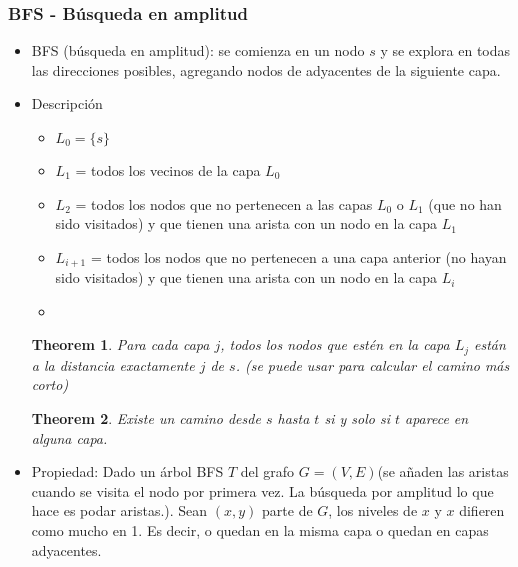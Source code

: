 \documentclass[12pt, fleqn]{article}
\newtheorem{theorem}{Theorem}[section]
\theoremstyle{definition}
\begin{document}
            \subsubsection{BFS - Búsqueda en amplitud}
                \begin{itemize}
                    \item BFS (búsqueda en amplitud): se comienza en un nodo $s$ y se explora en todas las direcciones posibles, 
                        agregando nodos de adyacentes de la siguiente capa.
                    \item Descripción
                        \begin{itemize}
                            \item $L_0 = \{s\}$
                            \item $L_1$ = todos los vecinos de la capa $L_0$
                            \item $L_2$ = todos los nodos que no pertenecen a las capas $L_0$ o $L_1$ (que no han sido visitados) 
                                y que tienen una arista con un nodo en la capa $L_1$
                            \item $L_{i+1}$ = todos los nodos que no pertenecen a una capa anterior (no hayan sido visitados) 
                                y que tienen una arista con un nodo en la capa $L_i$
                            \item 
                        \end{itemize}
                        \begin{theorem}
                            Para cada capa $j$, todos los nodos que estén en la capa $L_j$ están a la distancia exactamente $j$ de $s$. 
                            (se puede usar para calcular el camino más corto)
                        \end{theorem}
                        \begin{theorem}
                            Existe un camino desde $s$ hasta $t$ si y solo si $t$ aparece en alguna capa.
                        \end{theorem}
                    \item Propiedad: Dado un árbol BFS $T$ del grafo $G = (V, E)$(se añaden las aristas cuando se visita el nodo por primera vez. 
                        La búsqueda por amplitud lo que hace es podar aristas.). Sean $(x,y)$ parte de $G$, los niveles de $x$ y $x$ difieren como mucho en 1.
                        Es decir, o quedan en la misma capa o quedan en capas adyacentes.
                \end{itemize}
\end{document}

